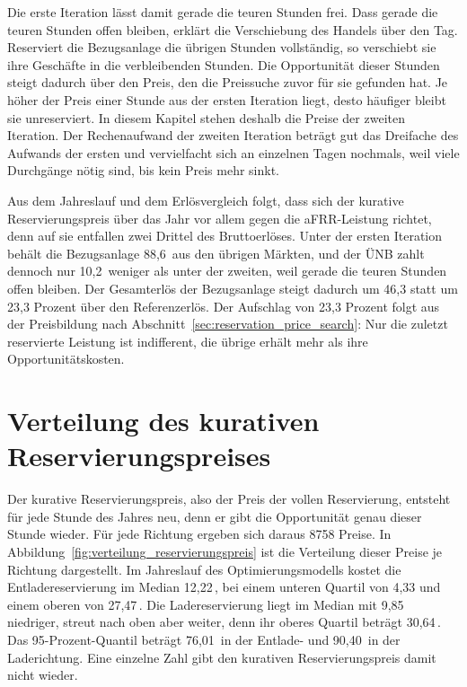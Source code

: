 Die erste Iteration lässt damit gerade die teuren Stunden frei.
Dass gerade die teuren Stunden offen bleiben, erklärt die Verschiebung des Handels über den Tag.
Reserviert die Bezugsanlage die übrigen Stunden vollständig, so verschiebt sie ihre Geschäfte in die verbleibenden Stunden.
Die Opportunität dieser Stunden steigt dadurch über den Preis, den die Preissuche zuvor für sie gefunden hat.
Je höher der Preis einer Stunde aus der ersten Iteration liegt, desto häufiger bleibt sie unreserviert.
In diesem Kapitel stehen deshalb die Preise der zweiten Iteration.
Der Rechenaufwand der zweiten Iteration beträgt gut das Dreifache des Aufwands der ersten und vervielfacht sich an einzelnen Tagen nochmals, weil viele Durchgänge nötig sind, bis kein Preis mehr sinkt.

Aus dem Jahreslauf und dem Erlösvergleich folgt, dass sich der kurative Reservierungspreis über das Jahr vor allem gegen die \ac{aFRR}-Leistung richtet, denn auf sie entfallen zwei Drittel des Bruttoerlöses.
Unter der ersten Iteration behält die Bezugsanlage 88,6\,\TsdEurMWa{} aus den übrigen Märkten, und der \ac{ÜNB} zahlt dennoch nur 10,2\,\TsdEurMWa{} weniger als unter der zweiten, weil gerade die teuren Stunden offen bleiben.
Der Gesamterlös der Bezugsanlage steigt dadurch um 46,3 statt um 23,3 Prozent über den Referenzerlös.
Der Aufschlag von 23,3 Prozent folgt aus der Preisbildung nach Abschnitt~\ref{sec:reservation_price_search}: Nur die zuletzt reservierte Leistung ist indifferent, die übrige erhält mehr als ihre Opportunitätskosten.

\section{Verteilung des kurativen Reservierungspreises}
\label{sec:price_distribution}

Der kurative Reservierungspreis, also der Preis der vollen Reservierung, entsteht für jede Stunde des Jahres neu, denn er gibt die Opportunität genau dieser Stunde wieder.
Für jede Richtung ergeben sich daraus 8758 Preise.
In Abbildung~\ref{fig:verteilung_reservierungspreis} ist die Verteilung dieser Preise je Richtung dargestellt.
Im Jahreslauf des Optimierungsmodells kostet die Entladereservierung im Median 12,22\,\EurMWh{}, bei einem unteren Quartil von 4,33 und einem oberen von 27,47\,\EurMWh{}.
Die Ladereservierung liegt im Median mit 9,85\,\EurMWh{} niedriger, streut nach oben aber weiter, denn ihr oberes Quartil beträgt 30,64\,\EurMWh{}.
Das 95-Prozent-Quantil beträgt 76,01\,\EurMWh{} in der Entlade- und 90,40\,\EurMWh{} in der Laderichtung.
Eine einzelne Zahl gibt den kurativen Reservierungspreis damit nicht wieder.

